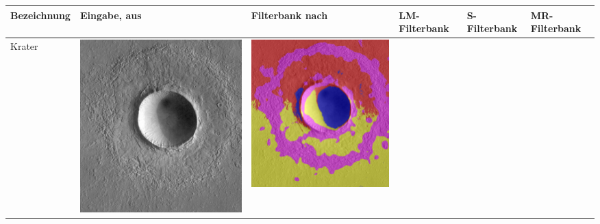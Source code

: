 \begin{table}[h!]
	\setlength\tabcolsep{0pt}
	\begin{tabularx}{\textwidth}{m{}
			>{\centering}m{}
			>{\centering}m{}
			>{\centering}m{}
			>{\centering}m{}
			>{\centering\arraybackslash}m{}}
		\toprule
		
		Bezeichnung &
		Eingabe, aus \cite{greeley_13} &
		Filterbank nach \cite{jain_91} &
		LM-Filterbank \cite{leung_01} &
		S-Filterbank \cite{schmid_01} &
		MR-Filterbank \cite{visgeo} \\
		
		\midrule
		Krater &
		\includegraphics[width=.9\linewidth]{images/Gre13/Gre13_01.jpg} &
		\includegraphics[width=.9\linewidth]{images/gen/filterbanks/Gre13_01.jpg_TSUGF.png} &

\end{tabularx}
\end{table}
